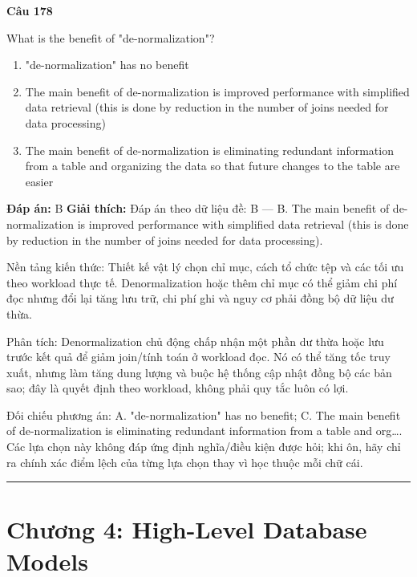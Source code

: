 \documentclass[11pt,a4paper]{article}
\newenvironment{question}[1]{%
  \par\vspace{1em}\noindent\textbf{\large Câu #1}\par\vspace{0.4em}
}{%
  \par\vspace{1em}\hrule\vspace{0.6em}
}
\newenvironment{choices}{%
  \begin{enumerate}[label=\textbf{\Alph*.},leftmargin=2.2em,itemsep=2pt,topsep=3pt]
}{%
  \end{enumerate}
}
\newcommand{\choice}{\item}
\begin{document}
\begin{question}{178}
What is the benefit of "de-normalization"?
\begin{choices}
\choice "de-normalization" has no benefit
\choice The main benefit of de-normalization is improved performance with simplified data retrieval (this is done by reduction in the number of joins needed for data processing)
\choice The main benefit of de-normalization is eliminating redundant information from a table and organizing the data so that future changes to the table are easier
\end{choices}
\textbf{Đáp án:} B
\textbf{Giải thích:} Đáp án theo dữ liệu đề: B — B. The main benefit of de-normalization is improved performance with simplified data retrieval (this is done by reduction in the number of joins needed for data processing).

Nền tảng kiến thức: Thiết kế vật lý chọn chỉ mục, cách tổ chức tệp và các tối ưu theo workload thực tế. Denormalization hoặc thêm chỉ mục có thể giảm chi phí đọc nhưng đổi lại tăng lưu trữ, chi phí ghi và nguy cơ phải đồng bộ dữ liệu dư thừa.

Phân tích: Denormalization chủ động chấp nhận một phần dư thừa hoặc lưu trước kết quả để giảm join/tính toán ở workload đọc. Nó có thể tăng tốc truy xuất, nhưng làm tăng dung lượng và buộc hệ thống cập nhật đồng bộ các bản sao; đây là quyết định theo workload, không phải quy tắc luôn có lợi.

Đối chiếu phương án: A. "de-normalization" has no benefit; C. The main benefit of de-normalization is eliminating redundant information from a table and org…. Các lựa chọn này không đáp ứng định nghĩa/điều kiện được hỏi; khi ôn, hãy chỉ ra chính xác điểm lệch của từng lựa chọn thay vì học thuộc mỗi chữ cái.
\end{question}


\newpage
\section*{Chương 4: High-Level Database Models}
\end{document}
